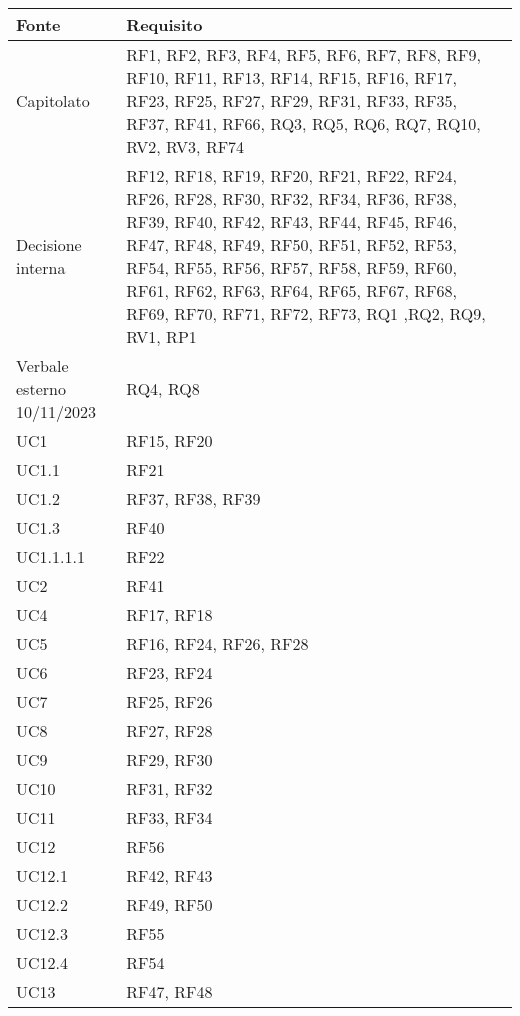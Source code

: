 \begin{center}
    \begin{longtable}{|C{5cm}|C{5cm}|}
        \hline
        \textbf{Fonte} & \textbf{Requisito} \\
        \hline
        Capitolato & RF1, RF2, RF3, RF4, RF5, RF6, RF7, RF8, RF9, RF10, RF11, RF13, RF14, RF15, RF16, RF17, RF23, RF25, RF27, RF29, RF31, RF33, RF35, RF37, RF41, RF66, RQ3, RQ5, RQ6, RQ7, RQ10, RV2, RV3, RF74  \\
        \hline
        Decisione interna & RF12, RF18, RF19, RF20, RF21, RF22, RF24, RF26, RF28, RF30, RF32, RF34, RF36, RF38, RF39, RF40, RF42, RF43, RF44, RF45, RF46, RF47, RF48, RF49, RF50, RF51, RF52, RF53, RF54, RF55, RF56, RF57, RF58, RF59, RF60, RF61, RF62, RF63, RF64, RF65, RF67, RF68, RF69, RF70, RF71, RF72, RF73, RQ1 ,RQ2, RQ9, RV1, RP1 \\
        \hline
        Verbale esterno 10/11/2023 & RQ4, RQ8 \\
        \hline
        UC1 & RF15, RF20 \\
        \hline
        UC1.1 & RF21 \\
        \hline
        UC1.2 & RF37, RF38, RF39 \\
        \hline
        UC1.3 & RF40 \\
        \hline
        UC1.1.1.1 & RF22 \\
        \hline
        UC2 & RF41 \\
        \hline
        UC4 & RF17, RF18 \\
        \hline
        UC5 & RF16, RF24, RF26, RF28 \\
        \hline
        UC6 & RF23, RF24 \\
        \hline
        UC7 & RF25, RF26 \\
        \hline
        UC8 & RF27, RF28 \\
        \hline
        UC9 & RF29, RF30 \\
        \hline
        UC10 & RF31, RF32 \\
        \hline
        UC11 & RF33, RF34 \\
        \hline
        UC12 & RF56 \\
        \hline
        UC12.1 & RF42, RF43 \\
        \hline
        UC12.2 & RF49, RF50 \\
        \hline
        UC12.3 & RF55 \\
        \hline
        UC12.4 & RF54 \\
        \hline
        UC13 & RF47, RF48 \\

\end{longtable}
\end{center}
